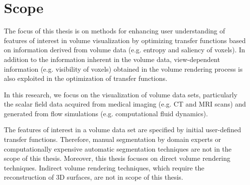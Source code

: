 

\section{Scope}

The focus of this thesis is on methods for enhancing user understanding of features of interest in volume visualization by optimizing transfer functions based on information derived from volume data (e.g. entropy and saliency of voxels). In addition to the information inherent in the volume data, view-dependent information (e.g. visibility of voxels) obtained in the volume rendering process is also exploited in the optimization of transfer functions.

In this research, we focus on the visualization of volume data sets, particularly the scalar field data acquired from medical imaging (e.g. CT and MRI scans) and generated from flow simulations (e.g. computational fluid dynamics).

The features of interest in a volume data set are specified by initial user-defined transfer functions.
Therefore, manual segmentation by domain experts or computationally expensive automatic segmentation techniques are not in the scope of this thesis.
Moreover, this thesis focuses on direct volume rendering techniques. Indirect volume rendering techniques, which require the reconstruction of 3D surfaces, are not in scope of this thesis.


